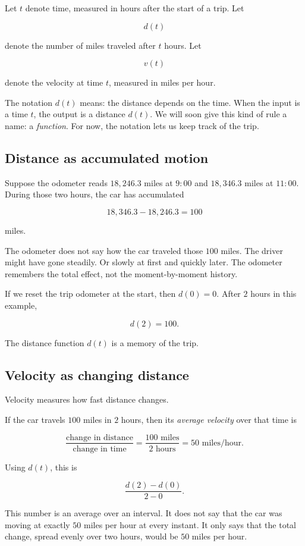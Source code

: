 Let \(t\) denote time, measured in hours after the start of a trip. Let

\[
d(t)
\]

denote the number of miles traveled after \(t\) hours. Let

\[
v(t)
\]

denote the velocity at time \(t\), measured in miles per hour.

The notation \(d(t)\) means: the distance depends on the time. When the input is a time \(t\), the output is a distance \(d(t)\). We will soon give this kind of rule a name: a \emph{function}. For now, the notation lets us keep track of the trip.

\subsection{Distance as accumulated motion}

Suppose the odometer reads \(18{,}246.3\) miles at \(9{:}00\) and \(18{,}346.3\) miles at \(11{:}00\). During those two hours, the car has accumulated

\[
18{,}346.3-18{,}246.3=100
\]

miles.

The odometer does not say how the car traveled those \(100\) miles. The driver might have gone steadily. Or slowly at first and quickly later. The odometer remembers the total effect, not the moment-by-moment history.

If we reset the trip odometer at the start, then \(d(0)=0\). After \(2\) hours in this example,

\[
d(2)=100.
\]

The distance function \(d(t)\) is a memory of the trip.

\subsection{Velocity as changing distance}

Velocity measures how fast distance changes.

If the car travels \(100\) miles in \(2\) hours, then its \emph{average velocity} over that time is

\[
\frac{\text{change in distance}}{\text{change in time}}
=
\frac{100\text{ miles}}{2\text{ hours}}
=
50\text{ miles/hour}.
\]

Using \(d(t)\), this is

\[
\frac{d(2)-d(0)}{2-0}.
\]

This number is an average over an interval. It does not say that the car was moving at exactly \(50\) miles per hour at every instant. It only says that the total change, spread evenly over two hours, would be \(50\) miles per hour.

